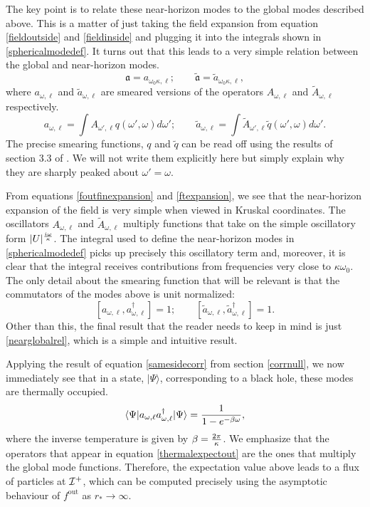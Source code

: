 \documentclass[12pt]{article}
\def\fout{f^{\text{out}}}
\newcommand{\cop}[1]{#1}
\def\ta{\widetilde{\cop{a}}}
\def\rtor{{r_*}}
\newcommand{\be}{\begin{equation}}
\newcommand{\ee}{\end{equation}}
\def \anh {\mathfrak{a}}
\def \tildanh {\widetilde{\mathfrak{a}}}
\def \scrip{{\cal I}^{+}}
\begin{document}
The key point is to relate these near-horizon modes to the global modes described above. This is a matter of just taking the field expansion from equation \eqref{fieldoutside} and \eqref{fieldinside} and plugging it into the integrals shown in \eqref{sphericalmodedef}.  It turns out that this leads to a very simple relation between the global and near-horizon modes.
\be
\label{nearglobalrel}
\anh = a_{\omega_0 \kappa, \ell}; \qquad \tildanh = \widetilde{a}_{\omega_0 \kappa, \ell},
\ee
where $a_{\omega, \ell}$ and $\widetilde{a}_{\omega, \ell}$ are smeared versions of the operators $A_{\omega, \ell}$ and $\widetilde{A}_{\omega, \ell}$ respectively. 
\be
\label{smearing}
a_{\omega, \ell} = \int A_{\omega', \ell} q(\omega', \omega) d \omega'; \qquad \widetilde{a}_{\omega, \ell} = \int \widetilde{A}_{\omega', \ell} \widetilde{q}(\omega',\omega) d \omega'.
\ee
The precise smearing functions, $q$ and $\widetilde{q}$  can be read off using the results of section 3.3 of \cite{Papadodimas:2019msp}. We will not write them explicitly here but simply explain why they are sharply peaked about $\omega' = \omega$.  

From equations \eqref{foutfinexpansion} and \eqref{ftexpansion}, we see that the near-horizon expansion of the field is very simple when viewed in Kruskal coordinates. The oscillators $A_{\omega, \ell}$ and $\widetilde{A}_{\omega, \ell}$ multiply functions that take on the simple oscillatory form  $|U|^{i \omega \over \kappa}$.  The integral used to define the near-horizon modes in \eqref{sphericalmodedef} picks up precisely this oscillatory term and, moreover,  it is clear that the integral receives contributions from frequencies very close to $\kappa \omega_0$. The only detail about the smearing function that will be relevant is 
that the commutators of the modes above is unit normalized: 
\be
\label{normofcomm}
[a_{\omega, \ell}, a_{\omega, \ell}^{\dagger}] = 1; \qquad [\ta_{\omega, \ell}, \ta_{\omega, \ell}^{\dagger}] = 1.
\ee
Other than this, the  final result that the reader needs to keep in mind is just \eqref{nearglobalrel}, which is a simple and intuitive result. 
 

Applying the result of equation \eqref{samesidecorr} from section \ref{corrnull}, we now immediately see that in a state, $|\Psi \rangle$, corresponding to a black hole, these modes are thermally occupied.
\be
\label{thermalexpectout}
\langle \Psi | a_{\omega, \ell} a_{\omega, \ell}^{\dagger} | \Psi  \rangle = {1 \over 1 - e^{-\beta \omega}},
\ee
where the inverse temperature is given by $\beta = {2 \pi \over \kappa}$.
We emphasize that the operators that appear in equation \eqref{thermalexpectout} are the ones that multiply the global mode functions. Therefore,  the expectation value above leads to a flux of particles at $\scrip$, which can be computed precisely using the asymptotic behaviour of $\fout$ as $\rtor \rightarrow \infty$.
\end{document}

